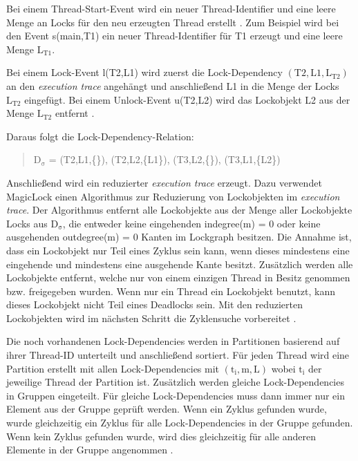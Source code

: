 Bei einem Thread-Start-Event wird ein neuer Thread-Identifier und eine leere
Menge an Locks für den neu erzeugten Thread erstellt
\autocite[vgl.][4]{MagicLock}. Zum Beispiel wird bei den Event \textrm{s(main,T1)}
ein neuer Thread-Identifier für \textrm{T1} erzeugt und eine leere Menge
$\mathrm{L_{T1}}$.

Bei einem Lock-Event \textrm{l(T2,L1)} wird zuerst die Lock-Dependency
$\mathrm{(T2,L1,L_{T2})}$ an den \emph{execution trace} angehängt und
anschließend \textrm{L1} in die Menge der Locks $\mathrm{L_{T2}}$ eingefügt. Bei
einem Unlock-Event \textrm{u(T2,L2)} wird das Lockobjekt \textrm{L2} aus der
Menge $\mathrm{L_{T2}}$ entfernt \autocite[vgl.][4]{MagicLock}.

Daraus folgt die Lock-Dependency-Relation:
\begin{quote}
  $\mathrm{D_\sigma}$ = \textrm{(T2,L1,\{\}), (T2,L2,\{L1\}), (T3,L2,\{\}),
  (T3,L1,\{L2\})}
\end{quote}
Anschließend wird ein reduzierter \emph{execution trace} erzeugt. Dazu verwendet
MagicLock einen Algorithmus zur Reduzierung von Lockobjekten im \emph{execution
trace}. Der Algorithmus entfernt alle Lockobjekte aus der Menge aller
Lockobjekte \textrm{Locks} aus $\mathrm{D_\sigma}$, die entweder keine
eingehenden \textrm{indegree(m) = 0} oder keine ausgehenden \textrm{outdegree(m)
= 0} Kanten im Lockgraph besitzen. Die Annahme ist, dass ein Lockobjekt nur Teil
eines Zyklus sein kann, wenn dieses mindestens eine eingehende und mindestens
eine ausgehende Kante besitzt. Zusätzlich werden alle Lockobjekte entfernt,
welche nur von einem einzigen Thread in Besitz genommen bzw. freigegeben wurden.
Wenn nur ein Thread ein Lockobjekt benutzt, kann dieses Lockobjekt nicht Teil
eines Deadlocks sein. Mit den reduzierten Lockobjekten wird im nächsten Schritt
die Zyklensuche vorbereitet \autocite[vgl.][4]{MagicLock}.

Die noch vorhandenen Lock-Dependencies werden in Partitionen basierend auf ihrer
Thread-ID unterteilt und anschließend sortiert. Für jeden Thread wird eine
Partition erstellt mit allen Lock-Dependencies mit $\mathrm{(t_i,m,L)}$ wobei
$\mathrm{t_i}$ der jeweilige Thread der Partition ist. Zusätzlich werden gleiche
Lock-Dependencies in Gruppen eingeteilt. Für gleiche Lock-Dependencies muss dann
immer nur ein Element aus der Gruppe geprüft werden. Wenn ein Zyklus gefunden
wurde, wurde gleichzeitig ein Zyklus für alle Lock-Dependencies in der Gruppe
gefunden. Wenn kein Zyklus gefunden wurde, wird dies gleichzeitig für alle
anderen Elemente in der Gruppe angenommen \autocite[vgl.][8-9]{MagicLock}.


